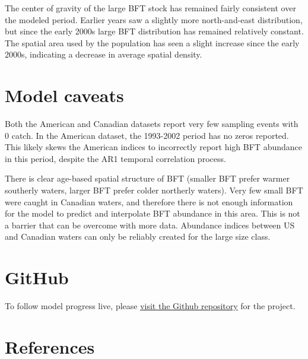 \documentclass[
]{article}
\begin{document}
The center of gravity of the large BFT stock has remained fairly consistent over the modeled period. Earlier years saw a slightly more north-and-east distribution, but since the early 2000s large BFT distribution has remained relatively constant. The spatial area used by the population has seen a slight increase since the early 2000s, indicating a decrease in average spatial density.

\newpage

\hypertarget{model-caveats}{%
\section{Model caveats}\label{model-caveats}}

Both the American and Canadian datasets report very few sampling events with 0 catch. In the American dataset, the 1993-2002 period has no zeros reported. This likely skews the American indices to incorrectly report high BFT abundance in this period, despite the AR1 temporal correlation process.

There is clear age-based spatial structure of BFT (smaller BFT prefer warmer southerly waters, larger BFT prefer colder northerly waters). Very few small BFT were caught in Canadian waters, and therefore there is not enough information for the model to predict and interpolate BFT abundance in this area. This is not a barrier that can be overcome with more data. Abundance indices between US and Canadian waters can only be reliably created for the large size class.

\hypertarget{github}{%
\section{GitHub}\label{github}}

To follow model progress live, please \href{https://github.com/Northeast-Climate-Integrated-Modeling/Atlantic-Bluefin-Tuna-Climate-Informed-Stock-Assessment}{visit the Github repository} for the project.

\hypertarget{references}{%
\section*{References}\label{references}}
\end{document}
